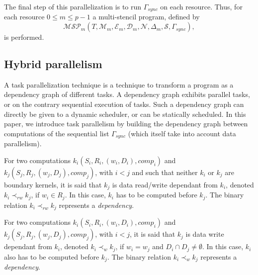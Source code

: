  The final step of this parallelization is to run $\Gamma_{sync}$ on each resource. Thus, for each resource $0 \leq m \leq p-1$ a multi-stencil program, defined by
\begin{equation}
\mathcal{MSP}_m(T,\mathcal{M}_m,\mathcal{E}_m,\mathcal{D}_m,\mathcal{N},\Delta_m,\mathcal{S},\Gamma_{sync}),
\end{equation}
is performed.

\subsection{Hybrid parallelism}
A task parallelization technique is a technique to transform a program as a dependency graph of different tasks. A dependency graph exhibits parallel tasks, or on the contrary sequential execution of tasks. Such a dependency graph can directly be given to a dynamic scheduler, or can be statically scheduled. In this paper, we introduce task parallelism by building the dependency graph between computations of the sequential list $\Gamma_{sync}$ (which itself take into account data parallelism).


\begin{mydef}
For two computations $k_i(S_i,R_i,(w_i,D_i),comp_i)$ and $k_j(S_j,R_j,(w_j,D_j),comp_j)$, with $i < j$ and such that neither $k_i$ or $k_j$ are boundary kernels, it is said that $k_j$ is data read/write dependant from $k_i$, denoted $k_i \prec_{rw} k_j$, if $w_i \in R_j$. In this case, $k_i$ has to be computed before $k_j$. The binary relation $k_i \prec_{rw} k_j$ represents a \textit{dependency}.
\end{mydef}

\begin{mydef}
For two computations $k_i(S_i,R_i,(w_i,D_i),comp_i)$ and $k_j(S_j,R_j,(w_j,D_j),comp_j)$, with $i < j$, it is said that $k_j$ is data write dependant from $k_i$, denoted $k_i \prec_{w} k_j$, if $w_i = w_j$ and $D_i \cap D_j \neq \emptyset$. In this case, $k_i$ also has to be computed before $k_j$. The binary relation $k_i \prec_{w} k_j$ represents a \textit{dependency}.
\end{mydef}

